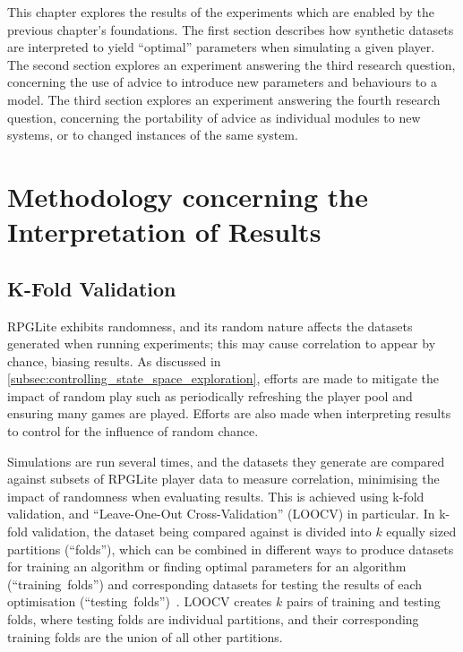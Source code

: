 This chapter explores the results of the experiments which are enabled by the
previous chapter's foundations.
The first section describes how synthetic datasets are interpreted to yield
``optimal'' parameters when simulating a given player.
The second section explores an experiment answering the third research question,
concerning the use of advice to introduce new parameters and behaviours to a model.
The third section explores an experiment answering the fourth research question,
concerning the portability of advice as individual modules to new systems, or to
changed instances of the same system.


\section{Methodology concerning the Interpretation of Results}
\subsection{K-Fold Validation}

RPGLite exhibits randomness, and its random nature affects the datasets
generated when running experiments; this may cause correlation to appear by
chance, biasing results. As discussed in
\cref{subsec:controlling_state_space_exploration}, efforts are made to mitigate
the impact of random play such as periodically refreshing the player pool and
ensuring many games are played. Efforts are also made when interpreting results
to control for the influence of random chance.

Simulations are run several times, and the datasets they generate are compared
against subsets of RPGLite player data to measure correlation, minimising the
impact of randomness when evaluating results. This is achieved using k-fold
validation, and ``Leave-One-Out Cross-Validation'' (LOOCV) in particular. In
k-fold validation, the dataset being compared against is divided into $k$
equally sized partitions (``folds''), which can be combined in different ways to
produce datasets for training an algorithm or finding optimal parameters for an
algorithm (``training~folds'') and corresponding datasets for testing the
results of each optimisation
(``testing~folds'')~\cite{k-fold-validation-definition}. LOOCV creates $k$ pairs
of training and testing folds, where testing folds are individual partitions,
and their corresponding training folds are the union of all other partitions.

